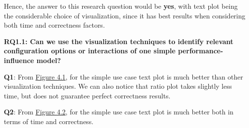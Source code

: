 Hence, the answer to this research question would be \textbf{yes}, with text plot being the considerable choice of visualization, since it has best results when considering both time and correctness factors.

\vskip 0.2in
\begin{mdframed}
\textbf{RQ1.1: Can we use the visualization techniques to identify relevant configuration options or interactions  of one simple performance-influence model?}
\end{mdframed}

\textbf{Q1}: From \hyperref[figure:paretoOneQ1]{Figure 4.1}, for the simple use case text plot is much better than other visualization techniques. We can also notice that ratio plot takes slightly less time, but does not guarantee perfect correctness results.

\textbf{Q2}: From \hyperref[figure:paretoOneQ2]{Figure 4.2}, for the simple use case text plot is much better both in terms of time and correctness. 

